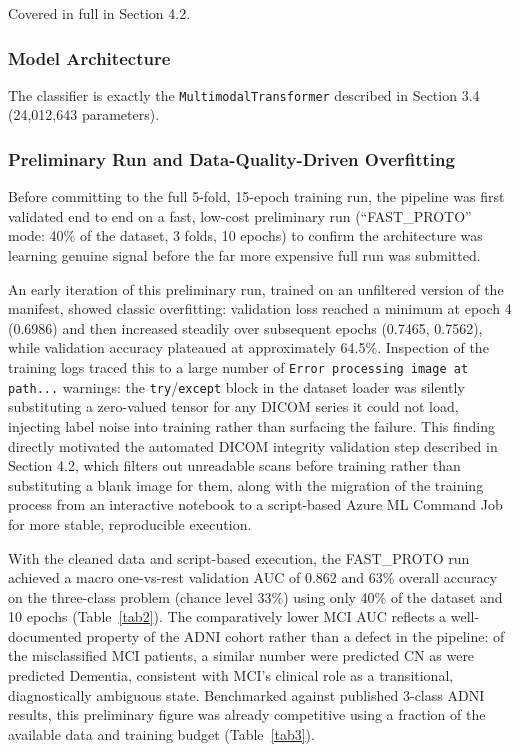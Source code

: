 \documentclass[pdflatex,sn-mathphys-num]{sn-jnl}%
\theoremstyle{thmstyleone}%
\theoremstyle{thmstyletwo}%
\theoremstyle{thmstylethree}%
\begin{document}
Covered in full in Section 4.2.

\subsubsection{Model Architecture}\label{sec5_1_4}

The classifier is exactly the \texttt{MultimodalTransformer} described in Section 3.4 (24,012,643 parameters).

\subsubsection{Preliminary Run and Data-Quality-Driven Overfitting}\label{sec5_1_5}

Before committing to the full 5-fold, 15-epoch training run, the pipeline was first validated end to end on a fast, low-cost preliminary run (``FAST\_PROTO'' mode: 40\% of the dataset, 3 folds, 10 epochs) to confirm the architecture was learning genuine signal before the far more expensive full run was submitted.

An early iteration of this preliminary run, trained on an unfiltered version of the manifest, showed classic overfitting: validation loss reached a minimum at epoch 4 (0.6986) and then increased steadily over subsequent epochs (0.7465, 0.7562), while validation accuracy plateaued at approximately 64.5\%. Inspection of the training logs traced this to a large number of \texttt{Error processing image at path...} warnings: the \texttt{try}/\texttt{except} block in the dataset loader was silently substituting a zero-valued tensor for any DICOM series it could not load, injecting label noise into training rather than surfacing the failure. This finding directly motivated the automated DICOM integrity validation step described in Section 4.2, which filters out unreadable scans before training rather than substituting a blank image for them, along with the migration of the training process from an interactive notebook to a script-based Azure ML Command Job for more stable, reproducible execution.

With the cleaned data and script-based execution, the FAST\_PROTO run achieved a macro one-vs-rest validation AUC of 0.862 and 63\% overall accuracy on the three-class problem (chance level 33\%) using only 40\% of the dataset and 10 epochs (Table~\ref{tab2}). The comparatively lower MCI AUC reflects a well-documented property of the ADNI cohort rather than a defect in the pipeline: of the misclassified MCI patients, a similar number were predicted CN as were predicted Dementia, consistent with MCI's clinical role as a transitional, diagnostically ambiguous state. Benchmarked against published 3-class ADNI results, this preliminary figure was already competitive using a fraction of the available data and training budget (Table~\ref{tab3}).
\end{document}

